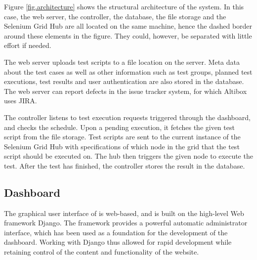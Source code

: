 Figure \ref{fig.architecture} shows the structural architecture of the system. In this case, the web server, the controller, the database, the file storage and the Selenium Grid Hub are all located on the same machine, hence the dashed border around these elements in the figure. They could, however, be separated with little effort if needed.

The web server uploads test scripts to a file location on the server. Meta data about the test cases as well as other information such as test groups, planned test executions, test results and user authentication are also stored in the database. The web server can report defects in the issue tracker system, for which Altibox uses JIRA.

The controller listens to test execution requests triggered through the dashboard, and checks the schedule. Upon a pending execution, it fetches the given test script from the file storage. Test scripts are sent to the current instance of the Selenium Grid Hub with specifications of which node in the grid that the test script should be executed on. The hub then triggers the given node to execute the test. After the test has finished, the controller stores the result in the database.















\subsection{Dashboard}
The graphical user interface of \toolname \space is web-based, and is built on the high-level Web framework Django. The framework provides a powerful automatic administrator interface, which has been used as a foundation for the development of the dashboard. Working with Django thus allowed for rapid development while retaining control of the content and functionality of the website.

